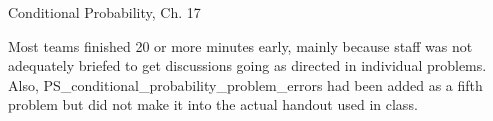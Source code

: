 \documentclass[handout]{mcs}
\begin{document}

\begin{staffnotes}
Conditional Probability, Ch. 17

Most teams finished 20 or more minutes early, mainly because staff was
not adequately briefed to get discussions going as directed in
individual problems.  Also, PS_conditional_probability_problem_errors
had been added as a fifth problem but did not make it into the actual
handout used in class.
\end{staffnotes}











\end{document}
